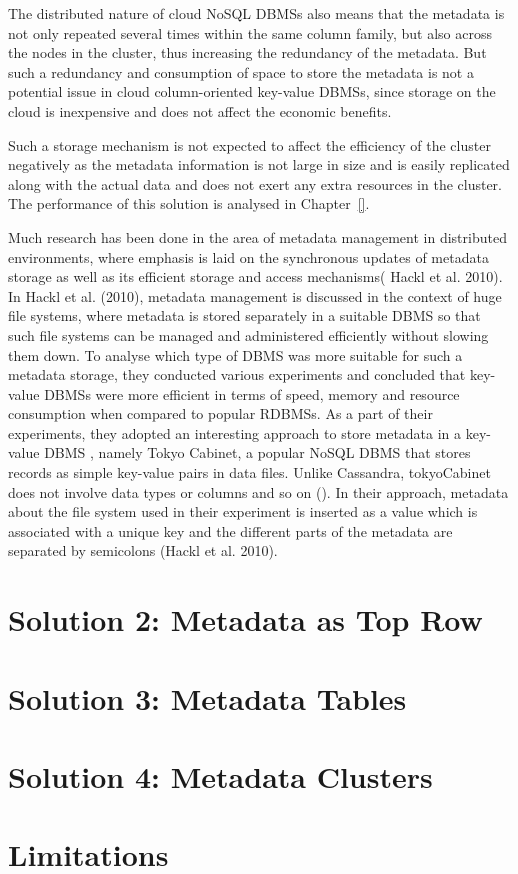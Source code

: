 	The distributed nature of cloud \ac{NoSQL} \acp{DBMS} also means that the
	metadata is not only repeated several times within the same column family,  but
	also across the nodes in the cluster, thus increasing the redundancy of
	the metadata.  But such a redundancy and consumption
	of space to store the metadata is not a potential issue
	in cloud column-oriented key-value \acp{DBMS}, since storage on the cloud is
	inexpensive and  does not affect the economic benefits.

	Such a storage mechanism is not expected to affect the efficiency of the
	cluster negatively as the metadata information is not large in size and is
	easily replicated along with the actual data and does not exert any extra
	resources in the cluster.  The performance of this solution is analysed  in
	Chapter~\ref{}.

	Much research has been done in the area of  metadata management in distributed
	environments,  where emphasis is laid on the synchronous updates of metadata
	storage as well as its efficient storage and access mechanisms(
	Hackl et al.  2010).
	In Hackl et al.  (2010),  metadata management is discussed in the context of
	huge file systems, where metadata is stored separately in a suitable \ac{DBMS}
	so that such file systems can be managed and administered efficiently without
	slowing them down.  To analyse which type of \ac{DBMS} was more suitable for such a
	metadata storage,  they conducted various experiments and concluded that
	key-value \acp{DBMS} were more efficient in terms of speed,  memory and resource
	consumption when compared to popular \acp{RDBMS}.  As a part of their
	experiments, they adopted an interesting approach to store metadata in a
	key-value \ac{DBMS} ,  namely Tokyo Cabinet,  a popular \ac{NoSQL} \ac{DBMS}
	that stores records as simple key-value pairs in data files. Unlike Cassandra,
	tokyoCabinet does not involve data types or columns
	and so on ().  In their approach,  metadata about the file system
	used in their experiment is inserted as a value which is associated with a unique key and the
	different parts of the metadata are separated by semicolons (Hackl et al.  2010).
	
\section{Solution 2:  Metadata as Top Row}\label{s:sol2}



\section{Solution 3:  Metadata Tables}\label{s:sol3}



\section{Solution 4:  Metadata Clusters}\label{s:sol4}

\section{Limitations}\label{s:lim}




